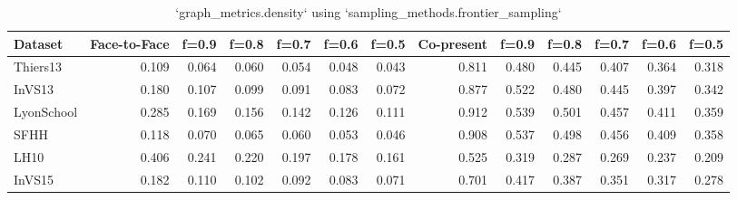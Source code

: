 \begin{table}[ht]
\begin{tabular}{lrrrrrrrrrrrr}
\hline
 Dataset    &   Face-to-Face &   f=0.9 &   f=0.8 &   f=0.7 &   f=0.6 &   f=0.5 &   Co-present &   f=0.9 &   f=0.8 &   f=0.7 &   f=0.6 &   f=0.5 \\
\hline
 Thiers13   &          0.109 &   0.064 &   0.060 &   0.054 &   0.048 &   0.043 &        0.811 &   0.480 &   0.445 &   0.407 &   0.364 &   0.318 \\
 InVS13     &          0.180 &   0.107 &   0.099 &   0.091 &   0.083 &   0.072 &        0.877 &   0.522 &   0.480 &   0.445 &   0.397 &   0.342 \\
 LyonSchool &          0.285 &   0.169 &   0.156 &   0.142 &   0.126 &   0.111 &        0.912 &   0.539 &   0.501 &   0.457 &   0.411 &   0.359 \\
 SFHH       &          0.118 &   0.070 &   0.065 &   0.060 &   0.053 &   0.046 &        0.908 &   0.537 &   0.498 &   0.456 &   0.409 &   0.358 \\
 LH10       &          0.406 &   0.241 &   0.220 &   0.197 &   0.178 &   0.161 &        0.525 &   0.319 &   0.287 &   0.269 &   0.237 &   0.209 \\
 InVS15     &          0.182 &   0.110 &   0.102 &   0.092 &   0.083 &   0.071 &        0.701 &   0.417 &   0.387 &   0.351 &   0.317 &   0.278 \\
\hline
\end{tabular}
\caption{`graph_metrics.density` using `sampling_methods.frontier_sampling`}
\end{table}